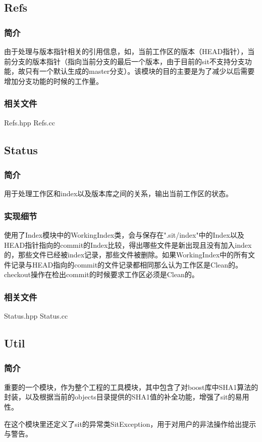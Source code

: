 \documentclass[11pt, a4paper, UTF8]{ctexart}
\begin{document}
\subsection{Refs}
\subsubsection{简介}
由于处理与版本指针相关的引用信息，如，当前工作区的版本（HEAD指针），当前分支的版本指针（指向当前分支的最后一个版本，由于目前的sit不支持分支功能，故只有一个默认生成的master分支）。该模块的目的主要是为了减少以后需要增加分支功能的时候的工作量。
\subsubsection{相关文件}
Refs.hpp Refs.cc

\subsection{Status}
\subsubsection{简介}
用于处理工作区和index以及版本库之间的关系，输出当前工作区的状态。
\subsubsection{实现细节}
使用了Index模块中的WorkingIndex类，会与保存在".sit/index"中的Index以及HEAD指针指向的commit的Index比较，得出哪些文件是新出现且没有加入index的，那些文件已经被index记录，那些文件被删除。如果WorkingIndex中的所有文件记录与HEAD指向的commit的文件记录都相同那么认为工作区是Clean的。checkout操作在检出commit的时候要求工作区必须是Clean的。
\subsubsection{相关文件}
Status.hpp Status.cc

\subsection{Util}
\subsubsection{简介}
重要的一个模块，作为整个工程的工具模块，其中包含了对boost库中SHA1算法的封装，以及根据当前的objects目录提供的SHA1值的补全功能，增强了sit的易用性。

在这个模块里还定义了sit的异常类SitException，用于对用户的非法操作给出提示与警告。
\end{document}
